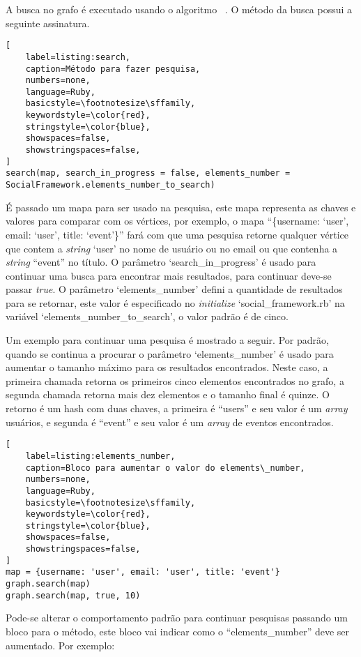 A busca no grafo é executado usando o algoritmo ~. O método da busca possui a seguinte assinatura.

\begin{lstlisting}[
    label=listing:search,
    caption=Método para fazer pesquisa,
    numbers=none,
    language=Ruby,
    basicstyle=\footnotesize\sffamily,
    keywordstyle=\color{red},
    stringstyle=\color{blue},
    showspaces=false,
    showstringspaces=false,
]
search(map, search_in_progress = false, elements_number = SocialFramework.elements_number_to_search)
\end{lstlisting}

É passado um mapa para ser usado na pesquisa, este mapa representa as chaves e valores para comparar com os vértices, por exemplo, o mapa ``\{username: `user', email: `user', title: `event'\}'' fará com que uma pesquisa retorne qualquer vértice que contem a \textit{string} `user' no nome de usuário ou no email ou que contenha a \textit{string} ``event'' no título. O parâmetro `search\_in\_progress' é usado para continuar uma busca para encontrar mais resultados, para continuar deve-se passar \textit{true}. O parâmetro `elements\_number' defini a quantidade de resultados para se retornar, este valor é especificado no \textit{initialize} `social\_framework.rb' na variável `elements\_number\_to\_search', o valor padrão é de cinco.

Um exemplo para continuar uma pesquisa é mostrado a seguir. Por padrão, quando se continua a procurar o parâmetro `elements\_number' é usado para aumentar o tamanho máximo para os resultados encontrados. Neste caso, a primeira chamada retorna os primeiros cinco elementos encontrados no grafo, a segunda chamada retorna mais dez elementos e o tamanho final é quinze. O retorno é um hash com duas chaves, a primeira é ``users'' e seu valor é um \textit{array} usuários, e segunda é ``event'' e seu valor é um \textit{array} de eventos encontrados.

\begin{lstlisting}[
    label=listing:elements_number,
    caption=Bloco para aumentar o valor do elements\_number,
    numbers=none,
    language=Ruby,
    basicstyle=\footnotesize\sffamily,
    keywordstyle=\color{red},
    stringstyle=\color{blue},
    showspaces=false,
    showstringspaces=false,
]
map = {username: 'user', email: 'user', title: 'event'}
graph.search(map)
graph.search(map, true, 10)
\end{lstlisting}

Pode-se alterar o comportamento padrão para continuar pesquisas passando um bloco para o método, este bloco vai indicar como o ``elements\_number'' deve ser aumentado. Por exemplo:

